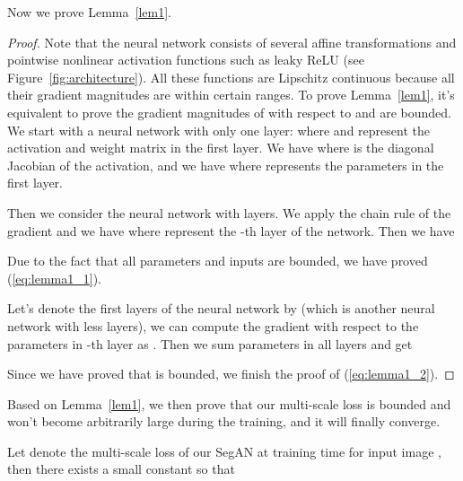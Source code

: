 \documentclass[twocolumn]{svjour3}
\begin{document}
Now we prove Lemma~\ref{lem1}.
\begin{proof}
Note that the neural network consists of several affine transformations and pointwise nonlinear activation functions such as leaky ReLU (see Figure~\ref{fig:architecture}). All these functions are Lipschitz continuous because all their gradient magnitudes are within certain ranges. To prove Lemma~\ref{lem1}, it's equivalent to prove the gradient magnitudes of  with respect to  and  are bounded. We start with a neural network with only one layer:  where  and  represent the activation and weight matrix in the first layer. We have  where  is the diagonal Jacobian of the activation, and we have
 where  represents the parameters in the first layer.

Then we consider the neural network with  layers.
We apply the chain rule of the gradient and we have  where  represent the -th layer of the network. Then we have

Due to the fact that all parameters and inputs are bounded, we have proved (\ref{eq:lemma1_1}).

Let's denote the first  layers of the neural network by  (which is another neural network with less layers), we can compute the gradient with respect to the parameters in -th layer as . Then we sum parameters in all layers and get

Since we have proved that  is bounded, we finish the proof of (\ref{eq:lemma1_2}).


\end{proof}

Based on Lemma~\ref{lem1}, we then prove that our multi-scale loss is bounded and won't become arbitrarily large during the training, and it will finally converge.

\begin{theorem}
Let  denote the multi-scale loss of our SegAN at training time  for input image , then there exists a small constant  so that

\label{thm:thm1}
\end{theorem}
\end{document}

